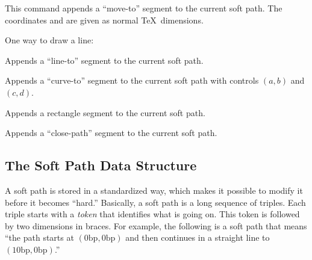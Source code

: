 \begin{command}{\pgfsyssoftpath@moveto{}}
  This command appends a ``move-to'' segment to the current soft
  path. The coordinates  and  are given as normal
  \TeX\ dimensions.

  \example One way to draw a line:
\begin{codeexample}
\pgfsyssoftpath@moveto{0pt}{0pt}
\pgfsyssoftpath@lineto{10pt}{10pt}
\pgfsyssoftpath@flushcurrentpath
\pgfsys@stroke
\end{codeexample}
\end{command}

\begin{command}{\pgfsyssoftpath@lineto{}}
  Appends a ``line-to'' segment to the current soft path. 
\end{command}

\begin{command}{\pgfsyssoftpath@curveto{}}
  Appends a ``curve-to'' segment to the current soft path with controls
  $(a,b)$ and $(c,d)$.
\end{command}

\begin{command}{\pgfsyssoftpath@rect{}}
  Appends a rectangle segment to the current soft path. 
\end{command}

\begin{command}{\pgfsyssoftpath@closepath}
  Appends a ``close-path'' segment to the current soft path. 
\end{command}




\subsection{The Soft Path Data Structure}

A soft path is stored in a standardized way, which makes it possible to
modify it before it becomes ``hard.'' Basically, a soft path is a long
sequence of triples. Each triple starts with a \emph{token} that
identifies what is going on. This token is followed by two dimensions in
braces. For example, the following is a soft path that means ``the
path starts at $(0\mathrm{bp}, 0\mathrm{bp})$ and then
continues in a straight line to $(10\mathrm{bp},
0\mathrm{bp})$.''

\begin{codeexample}
\pgfsyssoftpath@movetotoken{0bp}{0bp}\pgfsyssoftpath@linetotoken{10bp}{0bp}
\end{codeexample}

